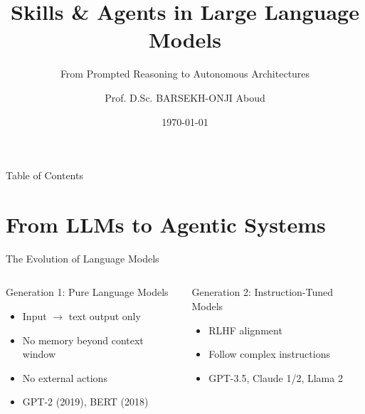 \documentclass[aspectratio=169,xcolor=dvipsnames]{beamer}
\title{Skills \& Agents in Large Language Models}
\subtitle{From Prompted Reasoning to Autonomous Architectures}
\author{Prof. D.Sc. BARSEKH-ONJI Aboud}
\institute{
    Facultad de Ingeniería \\
    Universidad Anáhuac México
}
\date{\today}
\begin{document}

\begin{frame}
    \titlepage
\end{frame}

\begin{frame}{Table of Contents}
    \tableofcontents
\end{frame}

\section{From LLMs to Agentic Systems}

\begin{frame}{The Evolution of Language Models}
    \begin{columns}
        \begin{block}{Generation 1: Pure Language Models}
            \begin{itemize}
                \item Input $\rightarrow$ text output only
                \item No memory beyond context window
                \item No external actions
                \item GPT-2 (2019), BERT (2018)
            \end{itemize}
        \end{block}
        \begin{block}{Generation 2: Instruction-Tuned Models}
            \begin{itemize}
                \item RLHF alignment
                \item Follow complex instructions
                \item GPT-3.5, Claude 1/2, Llama 2
            \end{itemize}
        \end{block}


\end{columns}
\end{frame}
\end{document}

